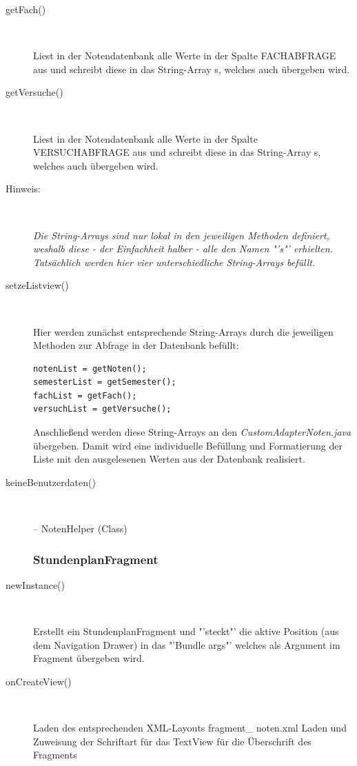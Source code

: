 \begin{description}
\item[getFach()]~\par
Liest in der Notendatenbank alle Werte in der Spalte \textcolor{lila}{FACHABFRAGE} aus und schreibt diese in das String-Array s, welches auch übergeben wird.

\item[getVersuche()]~\par
Liest in der Notendatenbank alle Werte in der Spalte \textcolor{lila}{VERSUCHABFRAGE} aus und schreibt diese in das String-Array s, welches auch übergeben wird.

\item[Hinweis:]~\par \textit{Die String-Arrays sind nur lokal in den jeweiligen Methoden definiert, weshalb diese - der Einfachheit halber - alle den Namen "'s"' erhielten. Tatsächlich werden hier vier unterschiedliche String-Arrays befüllt.}
 
\item[setzeListview()]~\par
Hier werden zunächst entsprechende String-Arrays durch die jeweiligen Methoden zur Abfrage in der Datenbank befüllt:
\begin{lstlisting}
notenList = getNoten();
semesterList = getSemester();
fachList = getFach();
versuchList = getVersuche();
\end{lstlisting}
Anschließend werden diese String-Arrays an den \textit{CustomAdapterNoten.java} übergeben. Damit wird eine individuelle Befüllung und Formatierung der Liste mit den ausgelesenen Werten aus der Datenbank realisiert.
 
\item[keineBenutzerdaten()]~\par
 
-- NotenHelper (Class)

\subsubsection{StundenplanFragment}

\item[newInstance()]~\par
Erstellt ein StundenplanFragment und "'steckt"' die aktive Position (aus dem Navigation Drawer) in das "'Bundle args"' welches als Argument im Fragment übergeben wird.
 
\item[onCreateView()]~\par
Laden des entsprechenden XML-Layouts fragment\_ noten.xml
Laden und Zuweisung der Schriftart für das TextView für die Überschrift des Fragments


\end{description}
